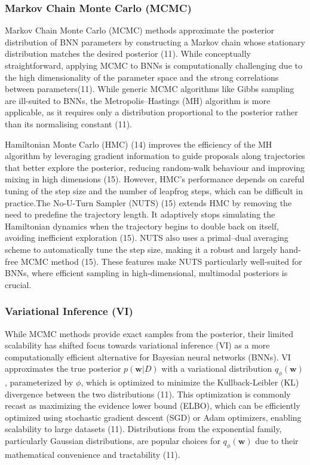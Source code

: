 \documentclass[
  a4paper,
]{scrreprt}
\begin{document}
\subsubsection{Markov Chain Monte Carlo
(MCMC)}\label{markov-chain-monte-carlo-mcmc}

Markov Chain Monte Carlo (MCMC) methods approximate the posterior
distribution of BNN parameters by constructing a Markov chain whose
stationary distribution matches the desired posterior (11). While
conceptually straightforward, applying MCMC to BNNs is computationally
challenging due to the high dimensionality of the parameter space and
the strong correlations between parameters(11). While generic MCMC
algorithms like Gibbs sampling are ill-suited to BNNs, the
Metropolis--Hastings (MH) algorithm is more applicable, as it requires
only a distribution proportional to the posterior rather than its
normalising constant (11).

Hamiltonian Monte Carlo (HMC) (14) improves the efficiency of the MH
algorithm by leveraging gradient information to guide proposals along
trajectories that better explore the posterior, reducing random-walk
behaviour and improving mixing in high dimensions (15). However, HMC's
performance depends on careful tuning of the step size and the number of
leapfrog steps, which can be difficult in practice.The No-U-Turn Sampler
(NUTS) (15) extends HMC by removing the need to predefine the trajectory
length. It adaptively stops simulating the Hamiltonian dynamics when the
trajectory begins to double back on itself, avoiding inefficient
exploration (15). NUTS also uses a primal--dual averaging scheme to
automatically tune the step size, making it a robust and largely
hand-free MCMC method (15). These features make NUTS particularly
well-suited for BNNs, where efficient sampling in high-dimensional,
multimodal posteriors is crucial.

\subsubsection{Variational Inference
(VI)}\label{variational-inference-vi}

While MCMC methods provide exact samples from the posterior, their
limited scalability has shifted focus towards variational inference (VI)
as a more computationally efficient alternative for Bayesian neural
networks (BNNs). VI approximates the true posterior
\(p(\mathbf{w} | D)\) with a variational distribution
\(q_{\phi}(\mathbf{w})\), parameterized by \(\phi\), which is optimized
to minimize the Kullback-Leibler (KL) divergence between the two
distributions (11). This optimization is commonly recast as maximizing
the evidence lower bound (ELBO), which can be efficiently optimized
using stochastic gradient descent (SGD) or Adam optimizers, enabling
scalability to large datasets (11). Distributions from the exponential
family, particularly Gaussian distributions, are popular choices for
\(q_{\phi}(\mathbf{w})\) due to their mathematical convenience and
tractability (11).
\end{document}
